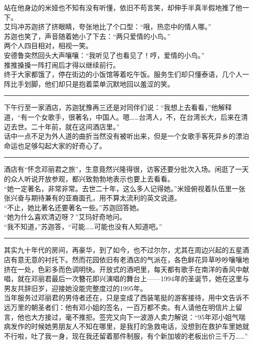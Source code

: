 \documentclass[oneside,11pt]{memoir} %
\begin{document}
\begin{CJK}{UTF8}{gbsn}
    站在他身边的米娅也不知有没有听懂，依旧不苟言笑，却伸手半真半假地推了他一下。\\\indent
    艾玛冲苏迦挤了挤眼睛，夸张地比了个口型：“哦，热恋中的情人哪。”\\\indent
    苏迦也笑了，声音随着她小了下去：“两只爱情的小鸟。”\\\indent
    两个人四目相对，相视一笑。\\\indent
    安德鲁突然回头大声嚷嚷：“我听见了也看见了！哼，爱情的小鸟。”\\\indent
    推推搡搡一阵打闹后才得以继续前行。\\\indent
    终于大家都饿了，停在街边的小饭馆等着吃午饭。服务生们却只懂泰语，几个人一阵比手划脚，他们却只是抱着菜单沉默地回以羞涩的笑。  \\\indent
 \rule{-3pt}{30pt}      
    下午行至一家酒店，苏迦犹豫再三还是对同伴们说：“我想上去看看，”他解释道，“有一个女歌手，很著名，中国人。嗯……台湾人，不，在台湾长大，后来在清迈去世。二十年前，就在这间酒店里。”\\\indent
    话中一点不足为外人道的曲折当然没有被听出来，但是一个女歌手客死异乡的漂泊命运也足够勾起大家的好奇心了。\\\indent
  \rule{-3pt}{30pt}    
    酒店有“怀念邓丽君之旅”，生意竟然兴隆得很，访客还要分批次入场。闲逛了一天的众人听说开放参观，都兴致勃勃地表示也要上去看看。  \\\indent
    “她一定著名，非常非常。去世二十年，这么多人记得她。”米娅俯视着队伍里一张张兴奋与期待兼有的亚裔面孔，用不算太流利的英文说道。\\\indent
    “不止，她比著名还要著名一些。”苏迦回答她。\\\indent
    “她为什么喜欢清迈呀？”艾玛好奇地问。\\\indent
    “我不知道，”苏迦答，“可能……可能也没有人知道吧。”\\\indent
 \rule{-3pt}{30pt} 
   其实九十年代的房间，再豪华，到了如今，也不过尔尔，尤其在周边兴起的五星酒店有意无意的衬托下。然而花园依旧有老酒店的气派在，各色鲜花异草吵吵嚷嚷地挤在一处，色彩多而色调明快。开放式的酒吧里，每天都有歌手在南洋的香风中献唱，就在邓丽君最后一次簪花即兴演唱的舞台上——1994年的圣诞节，她在这里与男友共辞旧岁，迎接她没能完整度过的1995年。\\\indent
    当年服务过邓丽君的男侍者还在，只是变成了西装笔挺的游客接待，用中文告诉不远万里的朝圣者们：他有邓小姐的签名，一百万都不卖。有人请他在明信片上留言，他也大方接过，毫不推拒。签完又向下一波游人卖力解说：“95年邓小姐气喘病发作的时候她男朋友人不知在哪里，是我打的急救电话，没想到在救护车里她就不行啦，吐了我一身，现在我还留着那件制服，有个新加坡的老板出价三千万……”\\\indent

\end{CJK}
\end{document}
